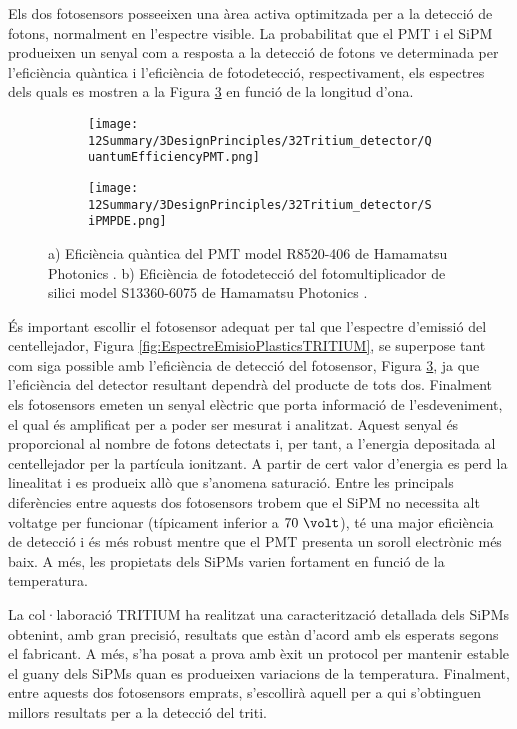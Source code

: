 Els dos fotosensors posseeixen una àrea activa optimitzada per a la detecció de fotons, normalment en l'espectre visible. La probabilitat que el PMT i el SiPM produeixen un senyal com a resposta a la detecció de fotons ve determinada per l'eficiència quàntica i l'eficiència de fotodetecció, respectivament, els espectres dels quals es mostren a la Figura \ref{fig:EficienciaFotosensors} en funció de la longitud d'ona. 
\begin{figure}[htpb]
\centering
    \begin{subfigure}[b]{0.55\textwidth}
    \centering
    \texttt{[image: 12Summary/3DesignPrinciples/32Tritium\_detector/QuantumEfficiencyPMT.png]}  
    \caption{\label{subfig:QEPMT}}
    \end{subfigure}
    \hfill
    \begin{subfigure}[b]{0.55\textwidth}
    \centering
    \texttt{[image: 12Summary/3DesignPrinciples/32Tritium\_detector/SiPMPDE.png]}  
    \caption{\label{subfig:PDESiPM}}
    \end{subfigure}
 \caption{a) Eficiència quàntica del PMT model R8520-406 de Hamamatsu Photonics \cite{DataSheetPMTs}. b) Eficiència de fotodetecció del fotomultiplicador de silici model S13360-6075 de Hamamatsu Photonics \cite{DataSheetHammamatsu_1_SiPM_1375}.}
 \label{fig:EficienciaFotosensors}
\end{figure}
És important escollir el fotosensor adequat per tal que l'espectre d'emissió del centellejador, Figura \ref{fig:EspectreEmisioPlasticsTRITIUM}, se superpose tant com siga possible amb l'eficiència de detecció del fotosensor, Figura \ref{fig:EficienciaFotosensors}, ja que l'eficiència del detector resultant dependrà del producte de tots dos. Finalment els fotosensors emeten un senyal elèctric que porta informació de l'esdeveniment, el qual és amplificat per a poder ser mesurat i analitzat. Aquest senyal és proporcional al nombre de fotons detectats i, per tant, a l'energia depositada al centellejador per la partícula ionitzant. A partir de cert valor d'energia es perd la linealitat i es produeix allò que s'anomena saturació. Entre les principals diferències entre aquests dos fotosensors trobem que el SiPM no necessita alt voltatge per funcionar (típicament inferior a $70~\volt$), té una major eficiència de detecció i és més robust mentre que el PMT presenta un soroll electrònic més baix. A més, les propietats dels SiPMs varien fortament en funció de la temperatura.

La col·laboració TRITIUM ha realitzat una caracterització detallada dels SiPMs obtenint, amb gran precisió, resultats que estàn d'acord amb els esperats segons el fabricant. A més, s'ha posat a prova amb èxit un protocol per mantenir estable el guany dels SiPMs quan es produeixen variacions de la temperatura. Finalment, entre aquests dos fotosensors emprats, s'escollirà aquell per a qui s'obtinguen millors resultats per a la detecció del triti.
